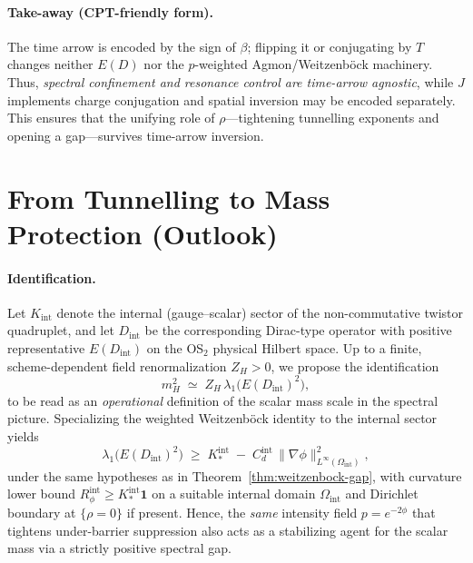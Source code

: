 \documentclass[11pt]{article}
\theoremstyle{definition}
\begin{document}
    \paragraph{Take-away (CPT-friendly form).}
    The time arrow is encoded by the sign of $\beta$; flipping it or conjugating by $T$ changes neither $E(D)$ nor the $p$-weighted Agmon/Weitzenböck machinery.
    Thus, \emph{spectral confinement and resonance control are time-arrow agnostic}, while $J$ implements charge conjugation and spatial inversion may be encoded separately.
    This ensures that the unifying role of $\rho$—tightening tunnelling exponents and opening a gap—survives time-arrow inversion.
    
    
    \section{From Tunnelling to Mass Protection (Outlook)}
    \label{sec:outlook-mass-protection}
    
    \paragraph{Identification.}
    Let $K_{\mathrm{int}}$ denote the internal (gauge--scalar) sector of the non-commutative twistor quadruplet, and let $D_{\mathrm{int}}$ be the corresponding Dirac-type operator with positive representative $E(D_{\mathrm{int}})$ on the OS$_2$ physical Hilbert space.
    Up to a finite, scheme-dependent field renormalization $Z_H>0$, we propose the identification
    \begin{equation}\label{eq:higgs-id}
    	m_H^2 \;\simeq\; Z_H\,\lambda_1\!\big(E(D_{\mathrm{int}})^2\big),
    \end{equation}
    to be read as an \emph{operational} definition of the scalar mass scale in the spectral picture.
    Specializing the weighted Weitzenb\"ock identity to the internal sector yields
    \begin{equation}\label{eq:gap-int}
    	\lambda_1\!\big(E(D_{\mathrm{int}})^2\!\big)\;\ge\;
    	K_\ast^{\mathrm{int}} \;-\; C_d^{\mathrm{int}}\,
    	\|\nabla\phi\|_{L^\infty(\Omega_{\mathrm{int}})}^{2},
    \end{equation}
    under the same hypotheses as in Theorem~\ref{thm:weitzenbock-gap}, with curvature lower bound $R_\phi^{\mathrm{int}}\!\ge K_\ast^{\mathrm{int}}\mathbf{1}$ on a suitable internal domain $\Omega_{\mathrm{int}}$ and Dirichlet boundary at $\{\rho=0\}$ if present.
    Hence, the \emph{same} intensity field $p = e^{-2\phi}$ that tightens under-barrier suppression also acts as a stabilizing agent for the scalar mass via a strictly positive spectral gap.
    
\end{document}
